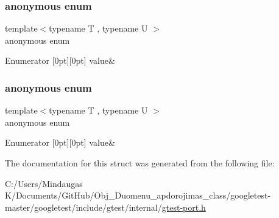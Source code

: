 \subsubsection{\texorpdfstring{anonymous enum}{anonymous enum}}
{\footnotesize\ttfamily template$<$typename T , typename U $>$ \\
anonymous enum}

\begin{DoxyEnumFields}{Enumerator}
[0pt][0pt]{}\mbox{\label{structtesting_1_1internal_1_1_is_same_a7b70487ca58f7865916972449e94defaaf3e815b266cfc5a9f664a9351cc74f29}} 
value&\\
\hline

\end{DoxyEnumFields}
\mbox{\label{structtesting_1_1internal_1_1_is_same_a2cfeb9b5d672af954b14a257f26c67f4}} 
\subsubsection{\texorpdfstring{anonymous enum}{anonymous enum}}
{\footnotesize\ttfamily template$<$typename T , typename U $>$ \\
anonymous enum}

\begin{DoxyEnumFields}{Enumerator}
[0pt][0pt]{}\mbox{\label{structtesting_1_1internal_1_1_is_same_a7b70487ca58f7865916972449e94defaaf3e815b266cfc5a9f664a9351cc74f29}} 
value&\\
\hline

\end{DoxyEnumFields}


The documentation for this struct was generated from the following file\+:\begin{DoxyCompactItemize}
\item 
C\+:/\+Users/\+Mindaugas K/\+Documents/\+Git\+Hub/\+Obj\+\_\+\+Duomenu\+\_\+apdorojimas\+\_\+class/googletest-\/master/googletest/include/gtest/internal/\mbox{\hyperlink{googletest-master_2googletest_2include_2gtest_2internal_2gtest-port_8h}{gtest-\/port.\+h}}\end{DoxyCompactItemize}
